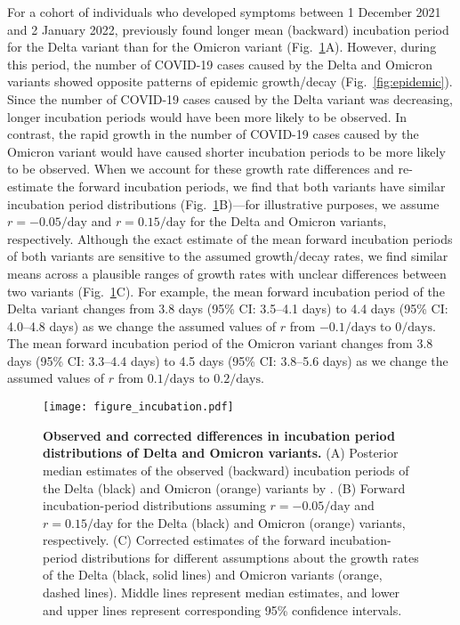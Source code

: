 \documentclass[12pt]{article}
\newcommand{\fref}[1]{Fig.~\ref{fig:#1}}
\begin{document}
For a cohort of individuals who developed symptoms between 1 December 2021 and 2 January 2022, \citep{backer2021omicron} previously found longer mean (backward) incubation period for the Delta variant than for the Omicron variant (\fref{incubation}A).
However, during this period, the number of COVID-19 cases caused by the Delta and Omicron variants showed opposite patterns of epidemic growth/decay (\fref{epidemic}).
Since the number of COVID-19 cases caused by the Delta variant was decreasing, longer incubation periods would have been more likely to be observed.
In contrast, the rapid growth in the number of COVID-19 cases caused by the Omicron variant would have caused shorter incubation periods to be more likely to be observed.
When we account for these growth rate differences and re-estimate the forward incubation periods, we find that both variants have similar incubation period distributions (\fref{incubation}B)---for illustrative purposes, we assume $r=-0.05/\mathrm{day}$ and $r=0.15/\mathrm{day}$ for the Delta and Omicron variants, respectively.
Although the exact estimate of the mean forward incubation periods of both variants are sensitive to the assumed growth/decay rates, we find similar means across a plausible ranges of growth rates with unclear differences between two variants (\fref{incubation}C).
For example, the mean forward incubation period of the Delta variant changes from 3.8 days (95\% CI: 3.5--4.1 days) to 4.4 days (95\% CI: 4.0--4.8 days) as we change the assumed values of $r$ from $-0.1/\mathrm{days}$ to $0/\mathrm{days}$.
The mean forward incubation period of the Omicron variant changes from 3.8 days (95\% CI: 3.3--4.4 days) to 4.5 days (95\% CI: 3.8--5.6 days) as we change the assumed values of $r$ from $0.1/\mathrm{days}$ to $0.2/\mathrm{days}$.

\begin{figure}[!th]
\texttt{[image: figure\_incubation.pdf]}
\caption{
\textbf{Observed and corrected differences in incubation period distributions of Delta and Omicron variants.}
(A) Posterior median estimates of the observed (backward) incubation periods of the Delta (black) and Omicron (orange) variants by \cite{backer2021omicron}.
(B) Forward incubation-period distributions assuming $r=-0.05/\mathrm{day}$ and $r=0.15/\mathrm{day}$ for the Delta (black) and Omicron (orange) variants, respectively.
(C) Corrected estimates of the forward incubation-period distributions for different assumptions about the growth rates of the Delta (black, solid lines) and Omicron variants (orange, dashed lines).
Middle lines represent median estimates, and lower and upper lines represent corresponding 95\% confidence intervals.
\label{fig:incubation}
}
\end{figure}
\end{document}
